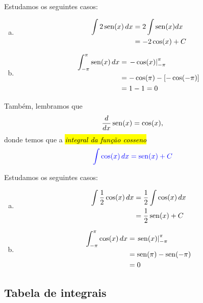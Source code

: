 \begin{ex}
  Estudamos os seguintes casos:
  \begin{enumerate}[a)]
  \item
    \begin{align}
      \int 2\operatorname{sen}(x)\,dx &= 2\int \operatorname{sen}(x) dx\\
                       &= -2\cos(x) + C
    \end{align}
  \item
    \begin{align}
      \int_{-\pi}^\pi\operatorname{sen}(x)\,dx &= \left.-\cos(x)\right|_{-\pi}^\pi\\
                                 &= -\cos(\pi) - [-\cos(-\pi)]\\
                                 &= 1 - 1 = 0
    \end{align}
  \end{enumerate}
\end{ex}

Também, lembramos que
\begin{equation}
  \frac{d}{dx}\operatorname{sen}(x) = \cos(x),
\end{equation}
donde temos que a \hl{\emph{integral da função cosseno}}
\begin{equation}\color{blue}\int \cos(x)\,dx = \operatorname{sen}(x) + C
\end{equation}

\begin{ex}
  Estudamos os seguintes casos:
  \begin{enumerate}[a)]
  \item
    \begin{align}
      \int \frac{1}{2}\cos(x)\,dx &= \frac{1}{2}\int\cos(x)\,dx\\
                                  &= \frac{1}{2}\operatorname{sen}(x) + C\\
    \end{align}
  \item
    \begin{align}
      \int_{-\pi}^\pi\cos(x)\,dx &= \left.\operatorname{sen}(x)\right|_{-\pi}^\pi\\
                                 &= \operatorname{sen}(\pi) - \operatorname{sen}(-\pi)\\
                                 &= 0
    \end{align}
  \end{enumerate}
\end{ex}

\subsection{Tabela de integrais}

